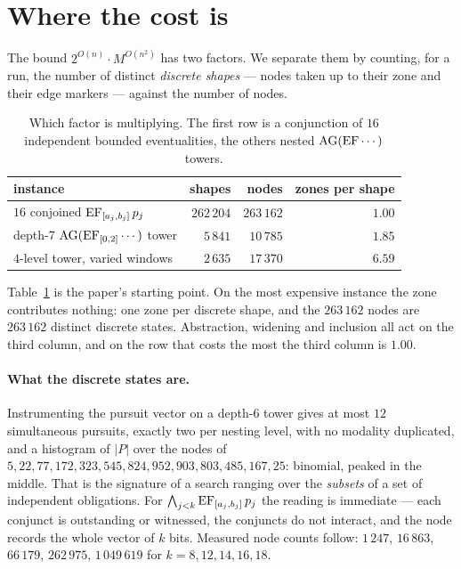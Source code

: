 \section{Where the cost is}
\label{sec:problem}

The bound $2^{O(n)}\cdot M^{O(n^{2})}$ has two factors. We separate them by
counting, for a run, the number of distinct \emph{discrete shapes} --- nodes
taken up to their zone and their edge markers --- against the number of nodes.

\begin{table}[t]
\centering
\caption{Which factor is multiplying. The first row is a conjunction of $16$
independent bounded eventualities, the others nested $\mathrm{AG}(\mathrm{EF}\cdots)$ towers.}
\label{tab:regimes}
\begin{tabular}{@{}lrrr@{}}
\toprule
instance & shapes & nodes & zones per shape \\
\midrule
$16$ conjoined $\mathrm{EF}_{[a_j,b_j]}\,p_j$      & $262\,204$ & $263\,162$ & $\mathbf{1.00}$ \\
depth-$7$ $\mathrm{AG}(\mathrm{EF}_{[0,2]}\cdots)$ tower   & $5\,841$   & $10\,785$  & $1.85$ \\
$4$-level tower, varied windows            & $2\,635$   & $17\,370$  & $6.59$ \\
\bottomrule
\end{tabular}
\end{table}

Table~\ref{tab:regimes} is the paper's starting point. On the most expensive
instance the zone contributes nothing: one zone per discrete shape, and the
$263\,162$ nodes are $263\,162$ distinct discrete states. Abstraction,
widening and inclusion all act on the third column, and on the row that costs
the most the third column is $1.00$.

\paragraph{What the discrete states are.} Instrumenting the pursuit vector on a
depth-$6$ tower gives at most $12$ simultaneous pursuits, exactly two per
nesting level, with no modality duplicated, and a histogram of $|P|$ over the
nodes of $5, 22, 77, 172, 323, 545, 824, 952, 903, 803, 485, 167, 25$:
binomial, peaked in the middle. That is the signature of a search ranging over
the \emph{subsets} of a set of independent obligations. For
$\bigwedge_{j<k}\mathrm{EF}_{[a_j,b_j]}\,p_j$ the reading is immediate --- each
conjunct is outstanding or witnessed, the conjuncts do not interact, and the
node records the whole vector of $k$ bits. Measured node counts follow:
$1\,247$, $16\,863$, $66\,179$, $262\,975$, $1\,049\,619$ for
$k=8,12,14,16,18$.


